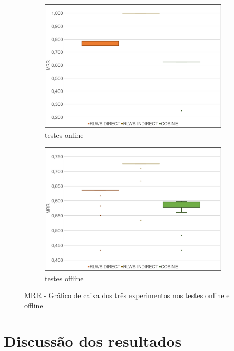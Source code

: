 \begin{figure}
    \begin{subfigure}{.5\textwidth}
        \centering
        \includegraphics[width=.8\linewidth]{imagens/mrr_box_plot_online.jpg}
        \caption{testes online}
        \label{fig:mrr_box_plot_a}
    \end{subfigure}%
    \begin{subfigure}{.5\textwidth}
        \centering
        \includegraphics[width=.8\linewidth]{imagens/mrr_box_plot_offline.jpg}
        \caption{testes offline}
        \label{fig:mrr_box_plot_b}
    \end{subfigure}
    \caption{MRR - Gráfico de caixa dos três experimentos nos testes online e offline}
    \label{fig:mrr_box_plot}
\end{figure}

\section{Discussão dos resultados}

